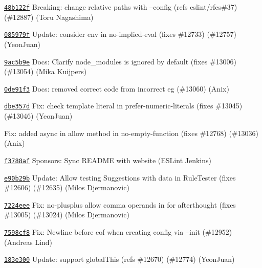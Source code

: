 \begin{DoxyItemize}
\item \href{https://github.com/eslint/eslint/commit/48b122f450b14dd27afef4c8115c69fca4f02be1}{\texttt{ {\ttfamily 48b122f}}} Breaking\+: change relative paths with --config (refs eslint/rfcs\#37) (\#12887) (Toru Nagashima)
\item \href{https://github.com/eslint/eslint/commit/085979fed9a5e24a87e4d92ee79272b59211d03f}{\texttt{ {\ttfamily 085979f}}} Update\+: consider env in no-\/implied-\/eval (fixes \#12733) (\#12757) (Yeon\+Juan)
\item \href{https://github.com/eslint/eslint/commit/9ac5b9edf06d16a9216c2c9b02bb20b6aa8ed0ab}{\texttt{ {\ttfamily 9ac5b9e}}} Docs\+: Clarify node\+\_\+modules is ignored by default (fixes \#13006) (\#13054) (Mika Kuijpers)
\item \href{https://github.com/eslint/eslint/commit/0de91f39a97cdf530cb64edbadde57a2bb41ca86}{\texttt{ {\ttfamily 0de91f3}}} Docs\+: removed correct code from incorrect eg (\#13060) (Anix)
\item \href{https://github.com/eslint/eslint/commit/dbe357de199620675446464f6fd0e35064c4d247}{\texttt{ {\ttfamily dbe357d}}} Fix\+: check template literal in prefer-\/numeric-\/literals (fixes \#13045) (\#13046) (Yeon\+Juan)
\item \href{https://github.com/eslint/eslint/commit/2260611e616bdc2a0bf16d508b60a50772ce7fbb}{\texttt{ {}}} Fix\+: added async in allow method in no-\/empty-\/function (fixes \#12768) (\#13036) (Anix)
\item \href{https://github.com/eslint/eslint/commit/f3788aff615edfbfb7afc4c491bb07d20737531b}{\texttt{ {\ttfamily f3788af}}} Sponsors\+: Sync README with website (ESLint Jenkins)
\item \href{https://github.com/eslint/eslint/commit/e90b29bb1f41d4e5767e33d03db5984f036586ed}{\texttt{ {\ttfamily e90b29b}}} Update\+: Allow testing Suggestions with data in Rule\+Tester (fixes \#12606) (\#12635) (Milos Djermanovic)
\item \href{https://github.com/eslint/eslint/commit/7224eee3ff4b4378d3439deb038bf34b116fa48b}{\texttt{ {\ttfamily 7224eee}}} Fix\+: no-\/plusplus allow comma operands in for afterthought (fixes \#13005) (\#13024) (Milos Djermanovic)
\item \href{https://github.com/eslint/eslint/commit/7598cf816bd854de1dd7d96cf00dec6ecc4564ac}{\texttt{ {\ttfamily 7598cf8}}} Fix\+: Newline before eof when creating config via --init (\#12952) (Andreas Lind)
\item \href{https://github.com/eslint/eslint/commit/183e3006841c29efdd245c45a72e6cefac86ae35}{\texttt{ {\ttfamily 183e300}}} Update\+: support global\+This (refs \#12670) (\#12774) (Yeon\+Juan)

\end{DoxyItemize}
